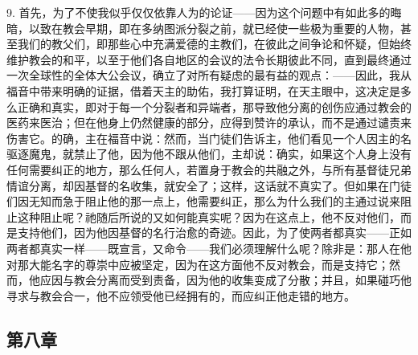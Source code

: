 9. 首先，为了不使我似乎仅仅依靠人为的论证——因为这个问题中有如此多的晦暗，以致在教会早期，即在多纳图派分裂之前，就已经使一些极为重要的人物，甚至我们的教父们，即那些心中充满爱德的主教们，在彼此之间争论和怀疑，但始终维护教会的和平，以至于他们各自地区的会议的法令长期彼此不同，直到最终通过一次全球性的全体大公会议，确立了对所有疑虑的最有益的观点：——因此，我从福音中带来明确的证据，借着天主的助佑，我打算证明，在天主眼中，这决定是多么正确和真实，即对于每一个分裂者和异端者，那导致他分离的创伤应通过教会的医药来医治；但在他身上仍然健康的部分，应得到赞许的承认，而不是通过谴责来伤害它。的确，主在福音中说：然而，当门徒们告诉主，他们看见一个人因主的名驱逐魔鬼，就禁止了他，因为他不跟从他们，主却说：确实，如果这个人身上没有任何需要纠正的地方，那么任何人，若置身于教会的共融之外，与所有基督徒兄弟情谊分离，却因基督的名收集，就安全了；这样，这话就不真实了。但如果在门徒们因无知而急于阻止他的那一点上，他需要纠正，那么为什么我们的主通过说来阻止这种阻止呢？祂随后所说的又如何能真实呢？因为在这点上，他不反对他们，而是支持他们，因为他因基督的名行治愈的奇迹。因此，为了使两者都真实——正如两者都真实一样——既宣言，又命令——我们必须理解什么呢？除非是：那人在他对那大能名字的尊崇中应被坚定，因为在这方面他不反对教会，而是支持它；然而，他应因与教会分离而受到责备，因为他的收集变成了分散；并且，如果碰巧他寻求与教会合一，他不应领受他已经拥有的，而应纠正他走错的地方。\par


\subsection{第八章}

